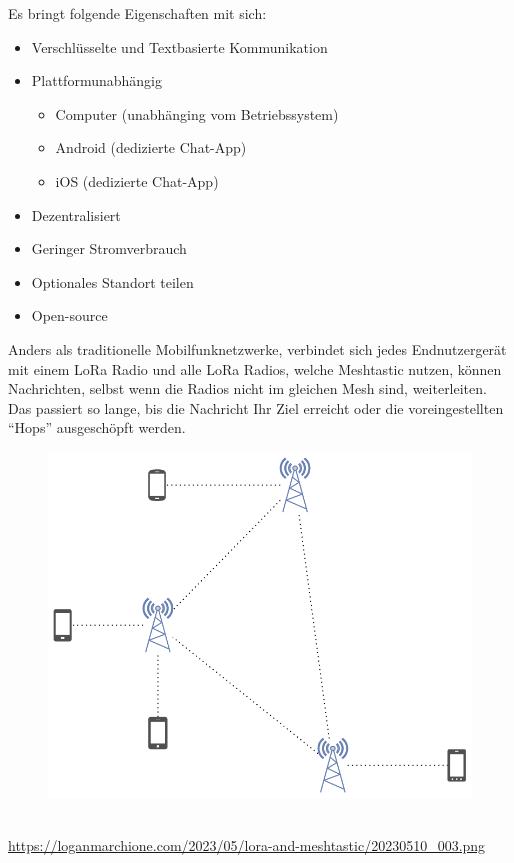 \documentclass[12pt,a4paper]{article}
\begin{document}
Es bringt folgende Eigenschaften mit sich:
\begin{itemize}
	\item Verschlüsselte und Textbasierte Kommunikation
	\item Plattformunabhängig
	\begin{itemize}
		\item Computer (unabhänging vom Betriebssystem)
		\item Android (dedizierte Chat-App)
		\item iOS (dedizierte Chat-App)
	\end{itemize}
	\item Dezentralisiert
	\item Geringer Stromverbrauch
	\item Optionales Standort teilen
	\item Open-source
\end{itemize}

Anders als traditionelle Mobilfunknetzwerke, verbindet sich jedes Endnutzergerät mit einem LoRa Radio und alle LoRa Radios, welche Meshtastic nutzen, können Nachrichten, selbst wenn die Radios nicht im gleichen Mesh sind, weiterleiten. Das passiert so lange, bis die Nachricht Ihr Ziel erreicht oder die voreingestellten “Hops” ausgeschöpft werden.
\begin{figure}[h]
	\includegraphics[scale=0.4]{./Bilder/Technologie/meshtastic-connections.png}
\end{figure}\\
\url{https://loganmarchione.com/2023/05/lora-and-meshtastic/20230510_003.png}
\newpage
\end{document}
